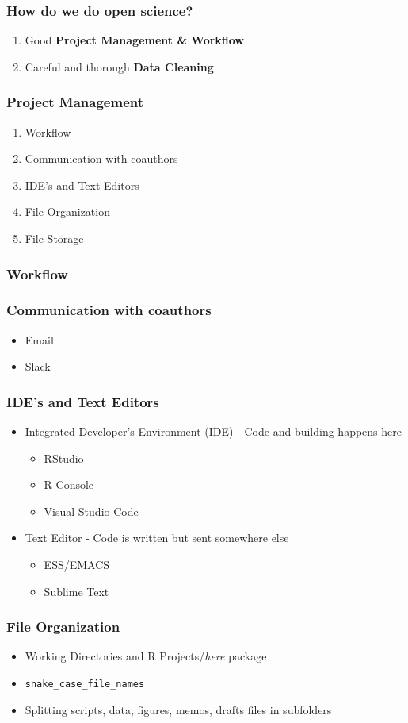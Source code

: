 \documentclass{beamer}
\begin{document}
	\begin{frame}
		\frametitle{How do we do open science?}
		\begin{enumerate}
			\item Good \textbf{Project Management \& Workflow}
			\item Careful and thorough \textbf{Data Cleaning}
		\end{enumerate}
	\end{frame}
	\begin{frame}
		\frametitle{Project Management}
		\begin{enumerate}
			\item Workflow
			\item Communication with coauthors
			\item IDE's and Text Editors
			\item File Organization
			\item File Storage
		\end{enumerate}
	\end{frame}
	\begin{frame}
		\frametitle{Workflow}
	\end{frame}
	\begin{frame}
		\frametitle{Communication with coauthors}
		\begin{itemize}
			\item Email
			\item Slack
		\end{itemize}
	\end{frame}
	\begin{frame}
		\frametitle{IDE's and Text Editors}
		\begin{itemize}
			\item Integrated Developer's Environment (IDE) - Code and building happens here
			\begin{itemize}
				\item RStudio
				\item R Console
				\item Visual Studio Code
			\end{itemize}
			\item Text Editor - Code is written but sent somewhere else
			\begin{itemize}
				\item ESS/EMACS
				\item Sublime Text
			\end{itemize}
		\end{itemize}
	\end{frame}
	\begin{frame}
		\frametitle{File Organization}
		\begin{itemize}
			\item Working Directories and R Projects/\textit{here} package
			\item \texttt{snake\_case\_file\_names}
			\item Splitting scripts, data, figures, memos, drafts files in subfolders
		\end{itemize}
	\end{frame}
\end{document}
